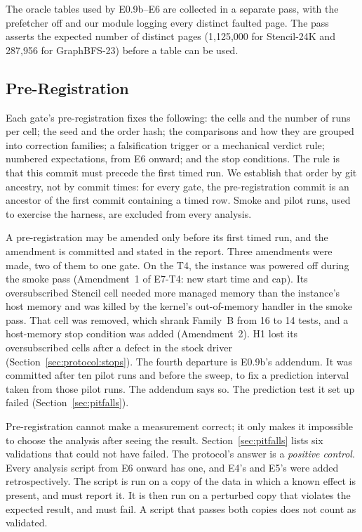 The oracle tables used by E0.9b--E6 are collected in a separate pass,
with the prefetcher off and our module logging every distinct faulted
page. The pass asserts the expected number of distinct pages
(1{,}125{,}000 for Stencil-24K and 287{,}956 for GraphBFS-23) before a
table can be used.

\subsection{Pre-Registration}
\label{sec:protocol:prereg}

Each gate's pre-registration fixes the following: the cells and the
number of runs per cell; the seed and the order hash; the comparisons
and how they are grouped into correction families; a falsification
trigger or a mechanical verdict rule; numbered expectations, from E6
onward; and the stop conditions. The rule is that this commit must
precede the first timed run. We establish that order by git ancestry,
not by commit times: for every gate, the pre-registration commit is an
ancestor of the first commit containing a timed row. Smoke and pilot
runs, used to exercise the harness, are excluded from every analysis.

A pre-registration may be amended only before its first timed run, and
the amendment is committed and stated in the report. Three amendments were made, two of them to one gate. On the T4, the instance was powered off during the smoke pass
(Amendment~1 of E7-T4: new start time and cap). Its oversubscribed
Stencil cell needed more managed memory than the instance's host memory
and was killed by the kernel's out-of-memory handler in the smoke pass.
That cell was removed, which shrank Family~B from 16 to 14 tests, and a
host-memory stop condition was added (Amendment~2). H1 lost its
oversubscribed cells after a defect in the stock driver
(Section~\ref{sec:protocol:stops}). The fourth departure is E0.9b's
addendum. It was committed after ten pilot runs and before the sweep,
to fix a prediction interval taken from those pilot runs. The addendum
says so. The prediction test it set up failed
(Section~\ref{sec:pitfalls}).

Pre-registration cannot make a measurement correct; it only makes it
impossible to choose the analysis after seeing the result. Section~\ref{sec:pitfalls}
lists six validations that could not have failed. The protocol's answer is a \emph{positive control}. Every analysis
script from E6 onward has one, and E4's and E5's were added
retrospectively. The script is run on a copy of the data in which a known effect
is present, and must report it. It is then run on a perturbed copy that
violates the expected result, and must fail. A script that passes both
copies does not count as validated.

